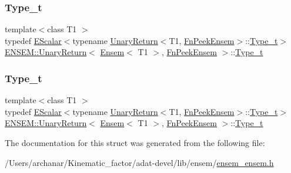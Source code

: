 \subsubsection{\texorpdfstring{Type\_t}{Type\_t}\hspace{0.1cm}{\footnotesize\ttfamily [2/3]}}
{\footnotesize\ttfamily template$<$class T1 $>$ \\
typedef \mbox{\hyperlink{classENSEM_1_1EScalar}{E\+Scalar}}$<$typename \mbox{\hyperlink{structENSEM_1_1UnaryReturn}{Unary\+Return}}$<$T1, \mbox{\hyperlink{structENSEM_1_1FnPeekEnsem}{Fn\+Peek\+Ensem}}$>$\+::\mbox{\hyperlink{structENSEM_1_1UnaryReturn_3_01Ensem_3_01T1_01_4_00_01FnPeekEnsem_01_4_a3bb59903a0e3c8d5e4b6ce0ac99c5454}{Type\+\_\+t}}$>$ \mbox{\hyperlink{structENSEM_1_1UnaryReturn}{E\+N\+S\+E\+M\+::\+Unary\+Return}}$<$ \mbox{\hyperlink{classENSEM_1_1Ensem}{Ensem}}$<$ T1 $>$, \mbox{\hyperlink{structENSEM_1_1FnPeekEnsem}{Fn\+Peek\+Ensem}} $>$\+::\mbox{\hyperlink{structENSEM_1_1UnaryReturn_3_01Ensem_3_01T1_01_4_00_01FnPeekEnsem_01_4_a3bb59903a0e3c8d5e4b6ce0ac99c5454}{Type\+\_\+t}}}

\mbox{\label{structENSEM_1_1UnaryReturn_3_01Ensem_3_01T1_01_4_00_01FnPeekEnsem_01_4_a3bb59903a0e3c8d5e4b6ce0ac99c5454}} 
\subsubsection{\texorpdfstring{Type\_t}{Type\_t}\hspace{0.1cm}{\footnotesize\ttfamily [3/3]}}
{\footnotesize\ttfamily template$<$class T1 $>$ \\
typedef \mbox{\hyperlink{classENSEM_1_1EScalar}{E\+Scalar}}$<$typename \mbox{\hyperlink{structENSEM_1_1UnaryReturn}{Unary\+Return}}$<$T1, \mbox{\hyperlink{structENSEM_1_1FnPeekEnsem}{Fn\+Peek\+Ensem}}$>$\+::\mbox{\hyperlink{structENSEM_1_1UnaryReturn_3_01Ensem_3_01T1_01_4_00_01FnPeekEnsem_01_4_a3bb59903a0e3c8d5e4b6ce0ac99c5454}{Type\+\_\+t}}$>$ \mbox{\hyperlink{structENSEM_1_1UnaryReturn}{E\+N\+S\+E\+M\+::\+Unary\+Return}}$<$ \mbox{\hyperlink{classENSEM_1_1Ensem}{Ensem}}$<$ T1 $>$, \mbox{\hyperlink{structENSEM_1_1FnPeekEnsem}{Fn\+Peek\+Ensem}} $>$\+::\mbox{\hyperlink{structENSEM_1_1UnaryReturn_3_01Ensem_3_01T1_01_4_00_01FnPeekEnsem_01_4_a3bb59903a0e3c8d5e4b6ce0ac99c5454}{Type\+\_\+t}}}



The documentation for this struct was generated from the following file\+:\begin{DoxyCompactItemize}
\item 
/\+Users/archanar/\+Kinematic\+\_\+factor/adat-\/devel/lib/ensem/\mbox{\hyperlink{adat-devel_2lib_2ensem_2ensem__ensem_8h}{ensem\+\_\+ensem.\+h}}\end{DoxyCompactItemize}
